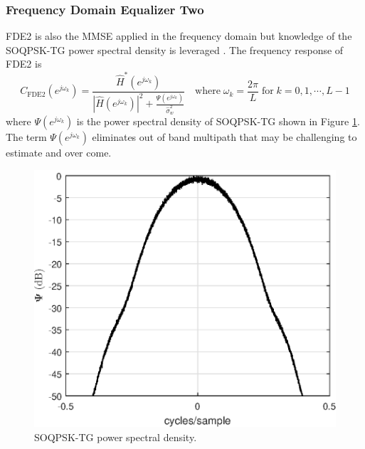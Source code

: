 \subsubsection{Frequency Domain Equalizer Two}
FDE2 is also the MMSE applied in the frequency domain but knowledge of the SOQPSK-TG power spectral density is leveraged \cite[eq. (12)]{williams2013linear}.
The frequency response of FDE2 is
\begin{equation}
C_\text{FDE2}(e^{j\omega_k}) = \frac{\hat{H}^\ast(e^{j\omega_k})}  {|\hat{H}(e^{j\omega_k})|^2  +  \frac{\Psi(e^{j\omega_k})}{\hat{\sigma}^2_w}} \quad
\text{where} \;
\omega_k = \frac{2\pi}{L} \;
\text{for} \;
k=0,1,\cdots,L-1
\label{eq:FDE2}
\end{equation}
where $\Psi(e^{j\omega_k})$ is the power spectral density of SOQPSK-TG shown in Figure \ref{fig:SOQPSK_spectrum}.
The term $\Psi(e^{j\omega_k})$ eliminates out of band multipath that may be challenging to estimate and over come.
\begin{figure}
	\centering\includegraphics[width=5in]{figures/eq_equations/FDE2_spectrum_PSI.eps}
	\caption{SOQPSK-TG power spectral density.}
	\label{fig:SOQPSK_spectrum}
\end{figure}
